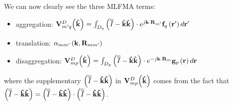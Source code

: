 We can now clearly see the three MLFMA terms:
\begin{itemize}
\item aggregation: $\mathbf{V}_{m'q}^D \! \left(\mathbf{\hat{k}}\right) = \int_{D_q} \left( \overline{\overline{I}}-\mathbf{\hat{k}}\mathbf{\hat{k}} \right) \cdot e^{j\mathbf{k} \cdot \mathbf{R}_{m'}} \mathbf{f}_q\left(\mathbf{r}'\right) d \mathbf{r}'$
\item translation: $\alpha_{mm'}\left(\mathbf{k}, \mathbf{R}_{mm'} \right)$
\item disaggregation: $\mathbf{V}_{mp}^D \! \left(\mathbf{\hat{k}}\right) = \int_{D_p} \left( \overline{\overline{I}}-\mathbf{\hat{k}}\mathbf{\hat{k}} \right) \cdot e^{-j\mathbf{k} \cdot \mathbf{R}_{m}} \mathbf{g}_p\left(\mathbf{r}\right) d \mathbf{r}$
\end{itemize}
where the supplementary $\left(\overline{\overline{I}}-\mathbf{\hat{k}}\mathbf{\hat{k}} \right)$ in $\mathbf{V}_{mp}^D \! \left(\mathbf{\hat{k}}\right)$ comes from the fact that $\left(\overline{\overline{I}}-\mathbf{\hat{k}}\mathbf{\hat{k}} \right) = \left(\overline{\overline{I}}-\mathbf{\hat{k}}\mathbf{\hat{k}} \right) \cdot \left(\overline{\overline{I}}-\mathbf{\hat{k}}\mathbf{\hat{k}} \right)$.

